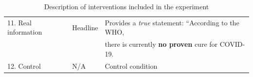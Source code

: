 \documentclass[letterpaper, 12pt, parskip=full,]{scrartcl}
\begin{document}
\begin{table}[H]
\begin{adjustbox}{max width = \textwidth}
\begin{tabular}{l|l|l}
11. Real information                                                                                                      & Headline                                                                                                     & Provides a \textit{true} statement: ``According to the WHO,\\ & & there is currently \textbf{no proven} cure for COVID-19.
 \\
12. Control                                                                                                        & N/A                                                                                                          & Control condition                                                                                                                                                                                                                                                                                                                                                                                              
\end{tabular}
\end{adjustbox}
\caption{Description of interventions included in the experiment}
\label{tab:treatments}
\end{table}
\end{document}
